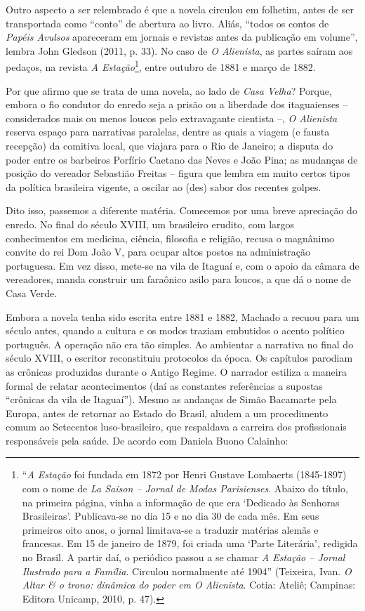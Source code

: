 Outro aspecto a ser relembrado é que a novela circulou em folhetim,
antes de ser transportada como ``conto'' de abertura ao livro. Aliás,
``todos os contos de \emph{Papéis Avulsos} apareceram em jornais e
revistas antes da publicação em volume'', lembra John Gledson (2011, p.
33). No caso de \emph{O Alienista}, as partes saíram aos pedaços, na
revista \emph{A Estação}\footnote{``\emph{A Estação} foi fundada em 1872
  por Henri Gustave Lombaerts (1845-1897) com o nome de \emph{La Saison
  -- Jornal de Modas Parisienses}. Abaixo do título, na primeira página,
  vinha a informação de que era `Dedicado às Senhoras Brasileiras'.
  Publicava-se no dia 15 e no dia 30 de cada mês. Em seus primeiros oito
  anos, o jornal limitava-se a traduzir matérias alemãs e francesas. Em
  15 de janeiro de 1879, foi criada uma `Parte Literária', redigida no
  Brasil. A partir daí, o periódico passou a se chamar \emph{A Estação
  -- Jornal Ilustrado para a Família}. Circulou normalmente até 1904''
  (Teixeira, Ivan. \emph{O Altar \& o trono: dinâmica do poder em O
  Alienista}. Cotia: Ateliê; Campinas: Editora Unicamp, 2010, p. 47).},
entre outubro de 1881 e março de 1882.

Por que afirmo que se trata de uma novela, ao lado de \emph{Casa Velha}?
Porque, embora o fio condutor do enredo seja a prisão ou a liberdade dos
itaguaienses -- considerados mais ou menos loucos pelo extravagante
cientista --, \emph{O Alienista} reserva espaço para narrativas
paralelas, dentre as quais a viagem (e fausta recepção) da comitiva
local, que viajara para o Rio de Janeiro; a disputa do poder entre os
barbeiros Porfírio Caetano das Neves e João Pina; as mudanças de posição
do vereador Sebastião Freitas -- figura que lembra em muito certos tipos
da política brasileira vigente, a oscilar ao (des) sabor dos recentes
golpes.

Dito isso, passemos a diferente matéria. Comecemos por uma breve
apreciação do enredo. No final do século XVIII, um brasileiro erudito,
com largos conhecimentos em medicina, ciência, filosofia e religião,
recusa o magnânimo convite do rei Dom João V, para ocupar altos postos
na administração portuguesa. Em vez disso, mete-se na vila de Itaguaí e,
com o apoio da câmara de vereadores, manda construir um faraônico asilo
para loucos, a que dá o nome de Casa Verde.

Embora a novela tenha sido escrita entre 1881 e 1882, Machado a recuou
para um século antes, quando a cultura e os modos traziam embutidos o
acento político português. A operação não era tão simples. Ao ambientar
a narrativa no final do século XVIII, o escritor reconstituiu protocolos
da época. Os capítulos parodiam as crônicas produzidas durante o Antigo
Regime. O narrador estiliza a maneira formal de relatar acontecimentos
(daí as constantes referências a supostas ``crônicas da vila de
Itaguaí''). Mesmo as andanças de Simão Bacamarte pela Europa, antes de
retornar ao Estado do Brasil, aludem a um procedimento comum ao
Setecentos luso-brasileiro, que respaldava a carreira dos profissionais
responsáveis pela saúde. De acordo com Daniela Buono Calainho:

